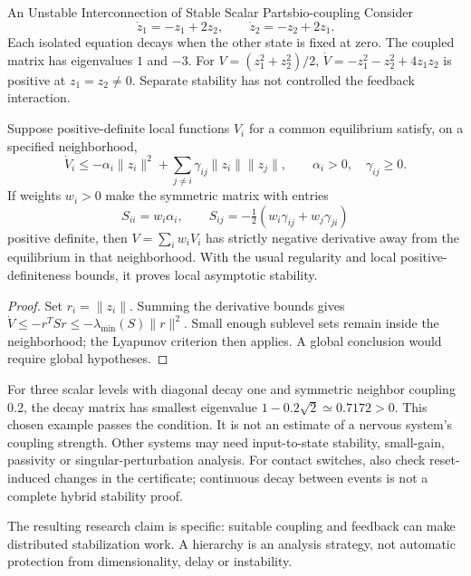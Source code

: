 \begin{example}[colframe=chapblue]{An Unstable Interconnection of Stable Scalar Parts}{bio-coupling}
Consider
\begin{equation}
\dot z_1=-z_1+2z_2,\qquad \dot z_2=-z_2+2z_1.
\label{eq:ch8:unstable-coupling}
\end{equation}
Each isolated equation decays when the other state is fixed at zero. The
coupled matrix has eigenvalues $1$ and $-3$. For
$V=(z_1^2+z_2^2)/2$, $\dot V=-z_1^2-z_2^2+4z_1z_2$ is positive at
$z_1=z_2\ne0$. Separate stability has not controlled the feedback interaction.
\end{example}

\begin{theorem}
\label{thm:nested-lyapunov}
Suppose positive-definite local functions $V_i$ for a common equilibrium satisfy,
on a specified neighborhood,
\[
\dot V_i\leq-\alpha_i\|z_i\|^2+
\sum_{j\ne i}\gamma_{ij}\|z_i\|\|z_j\|,
\qquad \alpha_i>0,\quad\gamma_{ij}\geq0.
\]
If weights $w_i>0$ make the symmetric matrix with entries
\[
S_{ii}=w_i\alpha_i,\qquad
S_{ij}=-\tfrac12(w_i\gamma_{ij}+w_j\gamma_{ji})
\]
positive definite, then $V=\sum_i w_iV_i$ has strictly negative derivative
away from the equilibrium in that neighborhood. With the usual regularity
and local positive-definiteness bounds, it proves local asymptotic stability.
\end{theorem}
\begin{proof}
Set $r_i=\|z_i\|$. Summing the derivative bounds gives
$\dot V\leq-r^TSr\leq-\lambda_{\min}(S)\|r\|^2$.
Small enough sublevel sets remain inside the neighborhood; the Lyapunov
criterion then applies. A global conclusion would require global hypotheses.
\end{proof}

For three scalar levels with diagonal decay one and symmetric neighbor coupling
0.2, the decay matrix has smallest eigenvalue $1-0.2\sqrt2\simeq0.7172>0$.
This chosen example passes the condition. It is not an estimate of a nervous
system's coupling strength. Other systems may need input-to-state stability,
small-gain, passivity or singular-perturbation analysis. For contact switches,
also check reset-induced changes in the certificate; continuous decay between
events is not a complete hybrid stability proof.

The resulting research claim is specific: suitable coupling and feedback can
make distributed stabilization work. A hierarchy is an analysis strategy,
not automatic protection from dimensionality, delay or instability.

